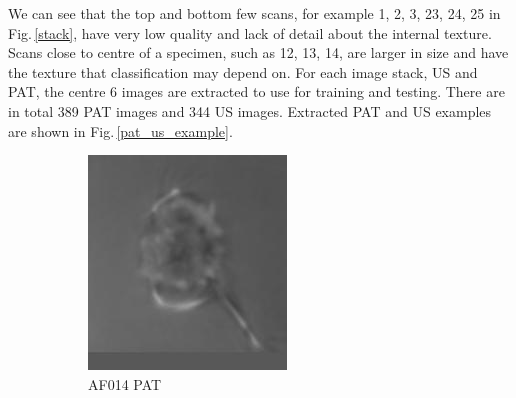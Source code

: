 We can see that the top and bottom few scans, for example 1, 2, 3, 23, 24, 25 in Fig.\,\ref{stack}, have very low quality and lack of detail about the internal texture. Scans close to centre of a specimen, such as 12, 13, 14, are larger in size and have the texture that classification may depend on. For each image stack, US and PAT, the centre 6 images are extracted to use for training and testing. There are in total 389 PAT images and 344 US images. Extracted PAT and US examples are shown in Fig.\,\ref{pat_us_example}.

\begin{figure}
\centering
\begin{subfigure}[b]{.24\linewidth}
\includegraphics[width=\linewidth]{Figs/PAT014_18.jpg}
\caption{AF014 PAT}
\end{subfigure}
\begin{subfigure}[b]{.24\linewidth}

\end{subfigure}
\end{figure}
